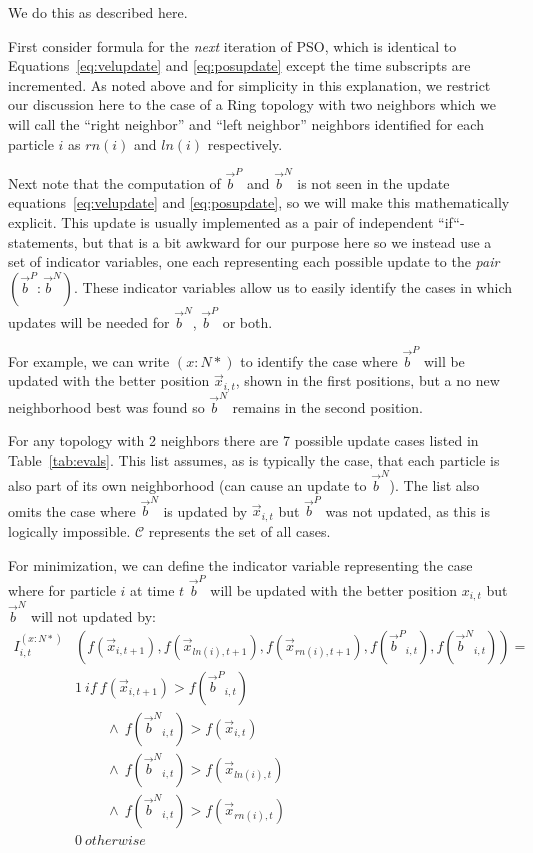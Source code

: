 \documentclass[journal,letterpaper]{IEEEtran}
\providecommand{\pers}{\ensuremath{P}}
\providecommand{\neigh}{\ensuremath{N}}
\providecommand{\ppos}{\ensuremath{\Vec{x}}}
\providecommand{\nbest}{\ensuremath{\Vec{b}^\neigh}}
\providecommand{\pbest}{\ensuremath{\Vec{b}^\pers}}
\providecommand{\ofunc}{\ensuremath{f}}
\providecommand{\indic}{\ensuremath{I}}
\providecommand{\ln}{\ensuremath{ln}}
\providecommand{\rn}{\ensuremath{rn}}
\providecommand{\caseset}{\ensuremath{\mathcal{C}}}
\providecommand{\casedef}{\ensuremath{(\pbest:\nbest)}}
\providecommand{\casexn}{\ensuremath{(x:\neigh*)}}
\begin{document}
We do this as described here.

First consider formula for the \emph{next} iteration of PSO, which is identical
to Equations~\eqref{eq:velupdate} and \eqref{eq:posupdate} except the time
subscripts are incremented.  As noted above and for simplicity in this
explanation, we restrict our discussion here to the case of a Ring topology
with two neighbors which we will call the ``right neighbor'' and ``left
neighbor'' neighbors identified for each particle $i$ as $\rn(i)$ and $\ln(i)$
respectively.

Next note that the computation of $\pbest$ and $\nbest$ is not seen in the
update equations~\eqref{eq:velupdate} and \eqref{eq:posupdate}, so we will make
this mathematically explicit.  This update is usually implemented as a pair of
independent ``if``-statements, but that is a bit awkward for our purpose here
so we instead use a set of indicator variables, one each representing each
possible update to the \emph{pair} $\casedef$.  These indicator variables allow
us to easily identify the cases in which updates will be needed for $\nbest$,
$\pbest$ or both.

For example, we can write $\casexn$ to identify the case where $\pbest$ will be
updated with the better position $\ppos_{i,t}$, shown in the first positions,
but a no new neighborhood best was found so $\nbest$ remains in the second
position.

For any topology with 2 neighbors there are 7 possible update cases listed in
Table~\ref{tab:evals}.  This list assumes, as is typically the case, that each
particle is also part of its own neighborhood (can cause an update to
$\nbest$). The list also omits the case where $\nbest$ is updated by
$\ppos_{i,t}$ but $\pbest$ was not updated, as this is logically impossible.
$\caseset$ represents the set of all cases.

For minimization, we can define the indicator variable representing the case
where for particle $i$ at time $t$ $\pbest$ will be updated with the better
position $x_{i,t}$ but $\nbest$ will not updated by:
\begin{align}
\nonumber
	\indic_{i,t}^{\casexn} & (\ofunc ( \ppos_{i,t+1} ) ,\ofunc(\ppos_{\ln(i),t+1}),\ofunc(\ppos_{\rn(i),t+1}) ,\ofunc(\pbest_{i,t}) ,\ofunc(\nbest_{i,t}))= \\
\nonumber
	& 1 \ if \  \ofunc(\ppos_{i,t+1}) > \ofunc(\pbest_{i,t}) \\
\nonumber
	& \quad \quad \ \wedge \ \ofunc(\nbest_{i,t}) > \ofunc(\ppos_{i,t}) \\
\nonumber
	& \quad \quad \ \wedge \ \ofunc(\nbest_{i,t}) > \ofunc(\ppos_{\ln(i),t}) \\
\nonumber
	& \quad \quad \ \wedge \ \ofunc(\nbest_{i,t}) > \ofunc(\ppos_{\rn(i),t}) \\
\label{eq:deficasexn}
	& 0 \ otherwise
\end{align}
\end{document}
